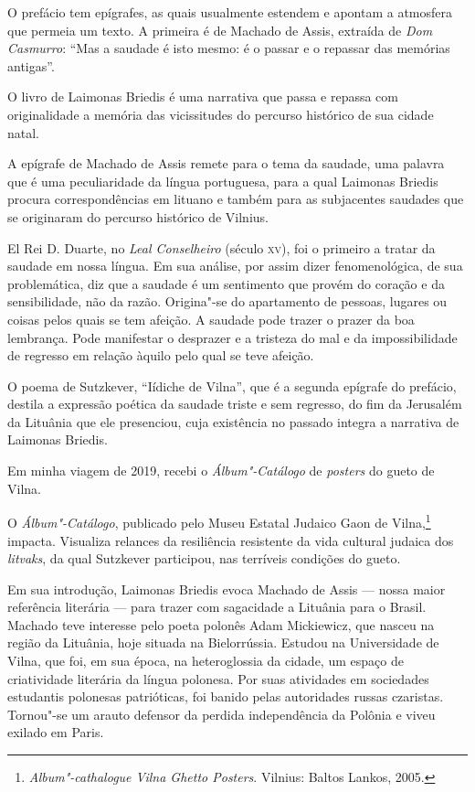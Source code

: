 O prefácio tem epígrafes, as quais usualmente estendem e apontam a
atmosfera que permeia um texto. A primeira é de Machado de Assis,
extraída de \textit{Dom Casmurro}: ``Mas a saudade é isto mesmo: é o
passar e o repassar das memórias antigas''.

O livro de Laimonas Briedis é uma narrativa que passa e repassa com
originalidade a memória das vicissitudes do percurso histórico de sua
cidade natal.

A epígrafe de Machado de Assis remete para o tema da saudade, uma
palavra que é uma peculiaridade da língua portuguesa, para a qual
Laimonas Briedis procura correspondências em lituano e também para as
subjacentes saudades que se originaram do percurso histórico de Vilnius.

El Rei D. Duarte, no \textit{Leal Conselheiro} (século \textsc{xv}), foi o primeiro
a tratar da saudade em nossa língua. Em sua análise, por assim dizer
fenomenológica, de sua problemática, diz que a saudade é um sentimento
que provém do coração e da sensibilidade, não da razão. Origina"-se do
apartamento de pessoas, lugares ou coisas pelos quais se tem afeição. A
saudade pode trazer o prazer da boa lembrança. Pode manifestar o
desprazer e a tristeza do mal e da impossibilidade de regresso em
relação àquilo pelo qual se teve afeição.

O poema de Sutzkever, ``Iídiche de Vilna'', que é a segunda epígrafe do
prefácio, destila a expressão poética da saudade triste e sem regresso,
do fim da Jerusalém da Lituânia que ele presenciou, cuja existência no
passado integra a narrativa de Laimonas Briedis.

Em minha viagem de 2019, recebi o \textit{Álbum"-Catálogo} de
\textit{posters} do gueto de Vilna.

O \textit{Álbum"-Catálogo}, publicado pelo Museu Estatal Judaico Gaon de
Vilna,\footnote{\textit{Album"-cathalogue Vilna Ghetto Posters}. Vilnius:
  Baltos Lankos, 2005.} impacta. Visualiza relances da resiliência
resistente da vida cultural judaica dos \textit{litvaks}, da qual
Sutzkever participou, nas terríveis condições do gueto.

Em sua introdução, Laimonas Briedis evoca Machado de Assis --- nossa
maior referência literária --- para trazer com sagacidade a Lituânia para
o Brasil. Machado teve interesse pelo poeta polonês Adam Mickiewicz, que
nasceu na região da Lituânia, hoje situada na Bielorrússia. Estudou na
Universidade de Vilna, que foi, em sua época, na heteroglossia da
cidade, um espaço de criatividade literária da língua polonesa. Por suas
atividades em sociedades estudantis polonesas patrióticas, foi banido
pelas autoridades russas czaristas. Tornou"-se um arauto defensor da
perdida independência da Polônia e viveu exilado em Paris.

